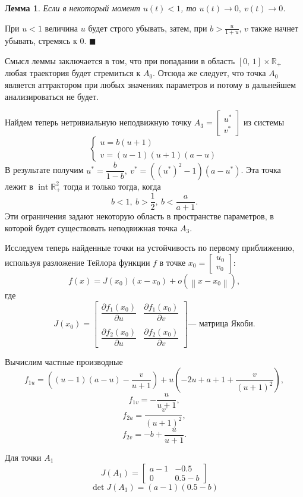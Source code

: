 \documentclass[16pt]{article}
\newtheorem{Lem}{Лемма}
\newenvironment{Proof}{\par\noindent{\bf Доказательство.}}{\hfill$\scriptstyle\blacksquare$}
\DeclareMathOperator{\Inter}{int}
\DeclareMathOperator{\Det}{det}
\newcommand\Col[2]{\begin{bmatrix}
#1 \\ #2
\end{bmatrix}}
\newcommand\Real{\mathbb{R}}
\newcommand\Norm[1]{\left\| #1 \right\|}
\begin{document}
\begin{Lem}
Если в некоторый момент $u(t) < 1$, то $u(t) \to 0, \ v(t) \to 0$. 
\end{Lem}
\begin{Proof}
При $u < 1$ величина $u$ будет строго убывать, затем, при $b > \frac{u}{1+u}$, $v$ также начнет убывать, стремясь к 0.
\end{Proof}

Смысл леммы заключается в том, что при попадании в область $[0,\,1] \times \Real_+$ любая траектория будет
стремиться к $A_0$. Отсюда же следует, что точка $A_0$ является аттрактором при любых значениях параметров и потому
в дальнейшем анализироваться не будет.

Найдем теперь нетривиальную неподвижную точку $A_3 = \Col{u^*}{v^*}$ из системы
$$
\begin{cases}
u = b(u+1)\\
v = (u-1)(u+1)(a-u)
\end{cases}
$$
В результате получим $u^* = \dfrac{b}{1-b}, \ v^* = ((u^*)^2-1)(a-u^*)$. Эта точка лежит в $\Inter \Real_+^2$
тогда и только тогда, когда
\begin{equation}\label{restr}
b < 1,\ b > \frac{1}{2},\ b < \dfrac{a}{a+1}.
\end{equation}
Эти ограничения задают некоторую область в пространстве параметров, в которой будет существовать неподвижная точка
$A_3$.

Исследуем теперь найденные точки на устойчивость по первому приближению, используя разложение Тейлора функции
$f$ в точке 
$x_0 = \Col{u_0}{v_0}$:
$$f(x) = J(x_0)(x - x_0) + o(\Norm{x-x_0}),$$
где
$$J(x_0) = \begin{bmatrix}
\dfrac{\partial f_1(x_0)}{\partial u}  & \dfrac{\partial f_1(x_0)}{\partial v} \\
\\
\dfrac{\partial f_2(x_0)}{\partial u}  & \dfrac{\partial f_2(x_0)}{\partial v} 
\end{bmatrix} \text{--- матрица Якоби.}
$$

Вычислим частные производные
$$ f_{1u} = \left( (u-1)(a-u) - \dfrac{v}{u+1} \right) + u \left( -2u + a + 1 + \dfrac{v}{(u+1)^2} \right),$$
$$ f_{1v} = -\dfrac{u}{u+1},$$
$$ f_{2u} = \dfrac{v}{(u+1)^2},$$
$$ f_{2v} = -b + \dfrac{u}{u + 1}.$$

Для точки $A_1$
$$J(A_1) = \begin{bmatrix}
a - 1 & -0.5 \\

0        & 0.5 - b
\end{bmatrix}
$$
$$\Det J(A_1) = (a-1)(0.5 - b)$$
\end{document}
